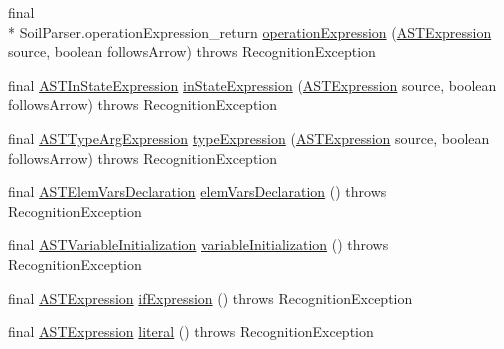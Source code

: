 \begin{DoxyCompactItemize}
\item 
final \\*
Soil\-Parser.\-operation\-Expression\-\_\-return \hyperlink{classorg_1_1tzi_1_1use_1_1parser_1_1soil_1_1_soil_parser_ac0f6fb87c70c77826034c30fcbd19d6e}{operation\-Expression} (\hyperlink{classorg_1_1tzi_1_1use_1_1parser_1_1ocl_1_1_a_s_t_expression}{A\-S\-T\-Expression} source, boolean follows\-Arrow)  throws Recognition\-Exception 
\item 
final \hyperlink{classorg_1_1tzi_1_1use_1_1parser_1_1ocl_1_1_a_s_t_in_state_expression}{A\-S\-T\-In\-State\-Expression} \hyperlink{classorg_1_1tzi_1_1use_1_1parser_1_1soil_1_1_soil_parser_a557558c119dc14e87d6e068a7e85df38}{in\-State\-Expression} (\hyperlink{classorg_1_1tzi_1_1use_1_1parser_1_1ocl_1_1_a_s_t_expression}{A\-S\-T\-Expression} source, boolean follows\-Arrow)  throws Recognition\-Exception 
\item 
final \hyperlink{classorg_1_1tzi_1_1use_1_1parser_1_1ocl_1_1_a_s_t_type_arg_expression}{A\-S\-T\-Type\-Arg\-Expression} \hyperlink{classorg_1_1tzi_1_1use_1_1parser_1_1soil_1_1_soil_parser_ab2b2426afd10df3243ce70843504b7fb}{type\-Expression} (\hyperlink{classorg_1_1tzi_1_1use_1_1parser_1_1ocl_1_1_a_s_t_expression}{A\-S\-T\-Expression} source, boolean follows\-Arrow)  throws Recognition\-Exception 
\item 
final \hyperlink{classorg_1_1tzi_1_1use_1_1parser_1_1ocl_1_1_a_s_t_elem_vars_declaration}{A\-S\-T\-Elem\-Vars\-Declaration} \hyperlink{classorg_1_1tzi_1_1use_1_1parser_1_1soil_1_1_soil_parser_acb31511df58040b4bb8a261336811f42}{elem\-Vars\-Declaration} ()  throws Recognition\-Exception 
\item 
final \hyperlink{classorg_1_1tzi_1_1use_1_1parser_1_1ocl_1_1_a_s_t_variable_initialization}{A\-S\-T\-Variable\-Initialization} \hyperlink{classorg_1_1tzi_1_1use_1_1parser_1_1soil_1_1_soil_parser_a4b58525c81f71ad8be04660844828380}{variable\-Initialization} ()  throws Recognition\-Exception 
\item 
final \hyperlink{classorg_1_1tzi_1_1use_1_1parser_1_1ocl_1_1_a_s_t_expression}{A\-S\-T\-Expression} \hyperlink{classorg_1_1tzi_1_1use_1_1parser_1_1soil_1_1_soil_parser_a5d7256b85186bee620c9d7dbb30facdc}{if\-Expression} ()  throws Recognition\-Exception 
\item 
final \hyperlink{classorg_1_1tzi_1_1use_1_1parser_1_1ocl_1_1_a_s_t_expression}{A\-S\-T\-Expression} \hyperlink{classorg_1_1tzi_1_1use_1_1parser_1_1soil_1_1_soil_parser_a4f9c95dd5bc17825af42ee4e03c32534}{literal} ()  throws Recognition\-Exception 
\item 

\end{DoxyCompactItemize}
